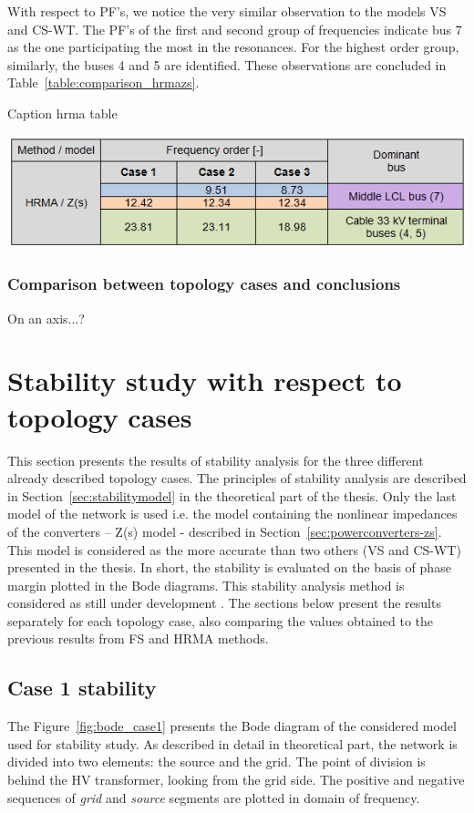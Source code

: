 \documentclass[12pt]{report} %
\begin{document}
With respect to PF's, we notice the very similar observation to the models VS and CS-WT. The PF's of the first and second group of frequencies indicate bus 7 as the one participating the most in the resonances. For the highest order group, similarly, the buses 4 and 5 are identified. These observations are concluded in Table~\ref{table:comparison_hrmazs}.

\begin{table}[htb]
	\centering
	\caption{Caption hrma table}
	\includegraphics[width=1\textwidth]{img/Case123/HRMA_Zs_table.png}
  	\label{table:comparison_hrmazs}
\end{table}
\FloatBarrier

\subsubsection{Comparison between topology cases and conclusions}
On an axis...?

\section{Stability study with respect to topology cases}
This section presents the results of stability analysis for the three different already described topology cases. The principles of stability analysis are described in Section~\ref{sec:stabilitymodel} in the theoretical part of the thesis. Only the last model of the network is used i.e. the model containing the nonlinear impedances of the converters – Z(s) model - described in Section~\ref{sec:powerconverters-zs}. This model is considered as the more accurate than two others (VS and CS-WT) presented in the thesis. In short, the stability is evaluated on the basis of phase margin plotted in the Bode diagrams. This stability analysis method is considered as still under development \cite{borwin1}. The sections below present the results separately for each topology case, also comparing the values obtained to the previous results from FS and HRMA methods.

\subsection{Case 1 stability}
The Figure~\ref{fig:bode_case1} presents the Bode diagram of the considered model used for stability study. As described in detail in theoretical part, the network is divided into two elements: the source and the grid. The point of division is behind the HV transformer, looking from the grid side. The positive and negative sequences of \textit{grid} and \textit{source} segments are plotted in domain of frequency.
\end{document}
